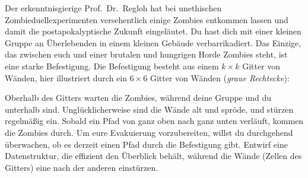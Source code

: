 \documentclass{uebung_cs}
\begin{document}
\begin{aufgabe}%
	Der erkenntnisgierige Prof.~Dr.~Regloh hat bei unethischen Zombieduellexperimenten versehentlich einige Zombies entkommen lassen und damit die postapokalyptische Zukunft eingeläutet.
	Du hast dich mit einer kleinen Gruppe an Überlebenden in einem kleinen Gebäude verbarrikadiert.
	Das Einzige, das zwischen euch und einer brutalen und hungrigen Horde Zombies steht, ist eine starke Befestigung. Die Befestigung besteht aus einem $k\times k$ Gitter von Wänden, hier illustriert durch ein $6\times 6$ Gitter von Wänden (\emph{graue Rechtecke}):

	\begin{center}
		\newcommand{\wallAt}[2]{
			\draw[fill=black!25,draw=none] (#1-0.45,#2*0.7+0.3) rectangle (#1+0.45,#2*0.7-0.3);
		}
		\hspace{0.7cm}
	\end{center}
	Oberhalb des Gitters warten die Zombies, während deine Gruppe und du unterhalb sind.
	Unglücklicherweise sind die Wände alt und spröde, und stürzen regelmäßig ein.
	Sobald ein Pfad von ganz oben nach ganz unten verläuft, kommen die Zombies durch.
	Um eure Evakuierung vorzubereiten, willst du durchgehend überwachen, ob es derzeit einen Pfad durch die Befestigung gibt.
	Entwirf eine Datenstruktur, die effizient den Überblick behält, während die Wände (Zellen des Gitters) eine nach der anderen einstürzen.
\end{aufgabe}
\end{document}
